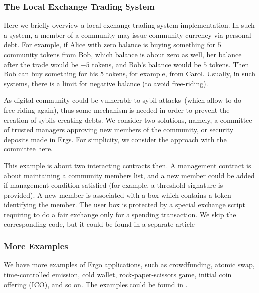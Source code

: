 
\subsubsection{The Local Exchange Trading System}
 \label{sec:platform}


 Here we briefly overview a local exchange trading system implementation. In such a system, a member of a community may
 issue community currency via personal debt. For example, if Alice with zero balance is buying something for $5$
 community tokens from Bob, which balance is about zero as well, her balance after the trade would be $-5$ tokens, and
 Bob's balance would be $5$ tokens. Then Bob can buy something for his $5$ tokens, for example, from Carol.
 Usually, in such systems, there is a limit for negative balance (to avoid free-riding).

 As digital community could be vulnerable to sybil attacks~(which allow to do free-riding again), thus some mechanism
 is needed in order to prevent the creation of sybils creating debts. We consider two solutions, namely, a committee of
 trusted managers approving new members of the community, or security deposits made in Ergs. For simplicity, we
 consider the approach with the committee here.

 This example is about two interacting contracts then. A management contract is about maintaining a
 community members list, and a new member could be added if management condition satisfied  (for example, a threshold
 signature is provided). A new member is associated with a box which contains a token identifying the member. The user
 box is protected by a special exchange script requiring to do a fair exchange only for a spending transaction.
 We skip the corresponding code, but it could be found in a separate article 

\subsubsection{More Examples}


 We have more examples of Ergo applications, such as crowdfunding, atomic swap, time-controlled emission,
 cold wallet, rock-paper-scissors game, initial coin offering (ICO), and so on. The examples could be
 found in \cite{ergoTutorial, ergoAdvTutorial}.